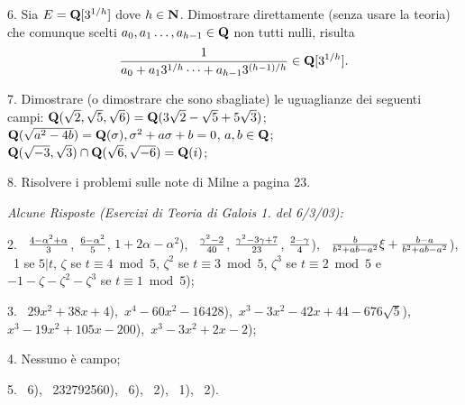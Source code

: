 \item{6.} Sia $E={\bf Q}[3^{1/h}]$ dove $h\in{\bf N}$. Dimostrare direttamente (senza usare la teoria)
che comunque scelti $a_0,a_1\ldots,a_{h-1}\in{\bf Q}$ non tutti nulli, risulta
$${1\over a_0+a_13^{1/h}\cdots+a_{h-1}3^{(h-1)/h}}\in{\bf Q}[3^{1/h}].$$
\bigskip

\item{7.} Dimostrare (o dimostrare che sono sbagliate) le uguaglianze dei seguenti campi:
 ${\bf Q}(\sqrt{2},\sqrt{5},\sqrt{6})={\bf Q}(3\sqrt{2}-\sqrt{5}+5\sqrt{3})$;\smallskip
{} ${\bf Q}(\sqrt{a^2-4b})={\bf Q}(\sigma), \sigma^2+a\sigma+b=0$, $a,b\in{\bf Q}$;\smallskip
{} ${\bf Q}(\sqrt{-3},\sqrt{3})\cap{\bf Q}(\sqrt{6},\sqrt{-6})={\bf Q}(i)$;
\bigskip

\item{8.} Risolvere i problemi sulle note di Milne a pagina 23.
\vfill

\bye 
\eject

\centerline{\it Alcune Risposte (Esercizi di Teoria di Galois 1. del 6/3/03):}

\item{2.}
\ ${4-\alpha^2+\alpha\over3}$, ${6-\alpha^2\over5}$, $1+2\alpha-\alpha^2$),\medskip
{}\ ${\gamma^2-2\over40}$, ${\gamma^2-3\gamma+7\over 23}$, ${2-\gamma\over 4}$),\medskip
{}\ ${b\over b^2+ab-a^2}\xi+{b-a\over b^2+ab-a^2}$),\medskip
{}\ 1 se $5|t$,\hfill\break
$\zeta$ se $t\equiv4\bmod5$,\hfill\break
$\zeta^2$ se $t\equiv3\bmod5$,\hfill\break
$\zeta^3$ se $t\equiv2\bmod5$ e \hfill\break
$-1-\zeta-\zeta^2-\zeta^3$ se $t\equiv1\bmod5$);\bigskip

\item{3.} \ $29x^2+38x+4$),\medskip {}\
$x^4-60x^2-16428$),\medskip {}\
$x^3-3x^2-42x+44-676\sqrt{5}$),\medskip {}\
$x^3-19x^2+105x-200$),\medskip {}\
$x^3-3x^2+2x-2$);\bigskip

\item{4.} Nessuno \`{e} campo;\bigskip

\item{5.}
\ 6),\medskip
\itemitem{(b.}\ 232792560),\medskip
{}\ 6),\medskip
{}\ 2),\medskip
\itemitem{(e.}\ 1),\medskip
\itemitem{(f.}\ 2).
\bye

